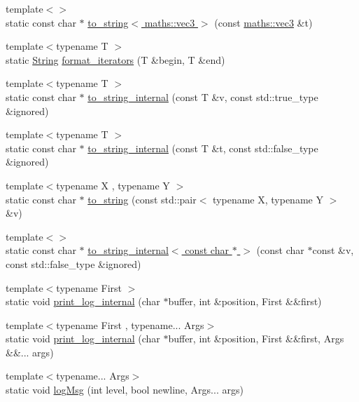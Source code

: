 \begin{DoxyCompactItemize}
{\footnotesize template$<$$>$ }\\static const char $\ast$ \hyperlink{namespacespork_1_1debug_ad9f34051f44d14eb4d3a792ed84c36c8}{to\+\_\+string$<$ maths\+::vec3 $>$} (const \hyperlink{structspork_1_1maths_1_1vec3}{maths\+::vec3} \&t)
\item 
{\footnotesize template$<$typename T $>$ }\\static \hyperlink{my_string_8h_afbeda3fd1bdc8c37d01bdf9f5c8274ff}{String} \hyperlink{namespacespork_1_1debug_adb4d1a890888f2ed6eb0e85d4cea5c49}{format\+\_\+iterators} (T \&begin, T \&end)
\item 
{\footnotesize template$<$typename T $>$ }\\static const char $\ast$ \hyperlink{namespacespork_1_1debug_a8fd0aebbc584e9053a2e81ad7f207c14}{to\+\_\+string\+\_\+internal} (const T \&v, const std\+::true\+\_\+type \&ignored)
\item 
{\footnotesize template$<$typename T $>$ }\\static const char $\ast$ \hyperlink{namespacespork_1_1debug_a2d49d37a5a0aa7df3d3b18376406be42}{to\+\_\+string\+\_\+internal} (const T \&t, const std\+::false\+\_\+type \&ignored)
\item 
{\footnotesize template$<$typename X , typename Y $>$ }\\static const char $\ast$ \hyperlink{namespacespork_1_1debug_a1365e215370f4a9ace42b9421077caf0}{to\+\_\+string} (const std\+::pair$<$ typename X, typename Y $>$ \&v)
\item 
{\footnotesize template$<$$>$ }\\static const char $\ast$ \hyperlink{namespacespork_1_1debug_a32859632cb378334e7808f5daf380ed8}{to\+\_\+string\+\_\+internal$<$ const char $\ast$ $>$} (const char $\ast$const \&v, const std\+::false\+\_\+type \&ignored)
\item 
{\footnotesize template$<$typename First $>$ }\\static void \hyperlink{namespacespork_1_1debug_ac9c88ed5e936f4ebbe5c09cbdc3d3c9f}{print\+\_\+log\+\_\+internal} (char $\ast$buffer, int \&position, First \&\&first)
\item 
{\footnotesize template$<$typename First , typename... Args$>$ }\\static void \hyperlink{namespacespork_1_1debug_abed0fd88d4a8b8ee6c705d43908d5fb5}{print\+\_\+log\+\_\+internal} (char $\ast$buffer, int \&position, First \&\&first, Args \&\&... args)
\item 
{\footnotesize template$<$typename... Args$>$ }\\static void \hyperlink{namespacespork_1_1debug_ae5b65f263f4686cf365b19f468fc1e53}{log\+Msg} (int level, bool newline, Args... args)
\end{DoxyCompactItemize}
